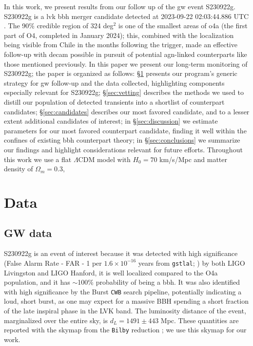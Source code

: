\documentclass[twocolumn]{aastex631}
\newcommand{\gweventid}{S230922g\xspace}
\begin{document}
In this work, we present results from our follow up of the \gls{gw} event \gweventid.
\gweventid is a \gls{lvk} \gls{bbh} merger candidate detected at 2023-09-22 02:03:44.886 UTC \citep{ligoscientificcollaborationLIGOVirgoKAGRA2023, ligoscientificcollaborationLIGOVirgoKAGRA2023a}.
The 90\% credible region of 324 deg$^2$ is one of the smallest areas of \gls{o4}a (the first part of O4, completed in January 2024); this, combined with the localization being visible from Chile in the months following the trigger, made an effective follow-up with \gls{decam} possible in pursuit of potential \gls{agn}-linked counterparts like those mentioned previously. 
In this paper we present our long-term monitoring of \gweventid; the paper is organized as follows:
\S\ref{sec:data} presents our program's generic strategy for \gls{gw} follow-up and the data collected, highlighting components especially relevant for \gweventid; \S\ref{sec:vetting} describes the methods we used to distill our population of detected transients into a shortlist of counterpart candidates; \S\ref{sec:candidates} describes our most favored candidate, and to a lesser extent additional candidates of interest; in \S\ref{sec:discussion} we estimate parameters for our most favored counterpart candidate, finding it well within the confines of existing \gls{bbh} counterpart theory; in \S\ref{sec:conclusions} we summarize our findings and highlight considerations relevant for future efforts.
Throughout this work we use a flat $\Lambda$CDM model with $H_0 = 70$ km/s/Mpc and matter density of $\Omega_m = 0.3$,

\section{Data}\label{sec:data}

\subsection{GW data}

S230922g is an event of interest because it was detected with high significance (False Alarm Rate - FAR - 1 per $1.6\times10^{-16}$ years from \texttt{gstlal}; \citealt{Messick_2017gstlal,sachdev2019gstlal}) by both LIGO Livingston and LIGO Hanford, it is well localized compared to the O4a population, and it has $\sim$100\% probability of being a \gls{bbh}.
It was also identified with high significance by the Burst \texttt{CWB} \citep{Klimenko_2016} search pipeline, potentially indicating a loud, short burst, as one may expect for a massive BBH spending a short fraction of the late inspiral phase in the LVK band.
The luminosity distance of the event, marginalized over the entire sky, is $d_L=1491 \pm 443$ Mpc.
These quantities are reported with the skymap from the \texttt{Bilby} \citep{Ashton_2019} reduction \citep{2023GCN.34758....1L}; we use this skymap for our work.
\end{document}
